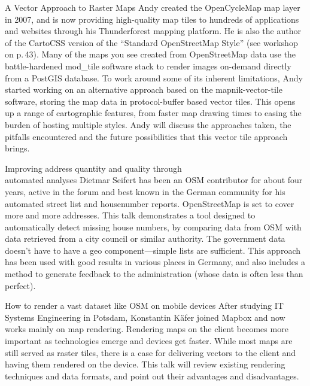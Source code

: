 %
{A Vector Approach to Raster Maps}%
{Andy created the OpenCycleMap map layer in 2007, and is now providing high-quality map tiles to hundreds of applications and websites through his Thunderforest mapping platform. He is also the author of the CartoCSS version of the ``Standard OpenStreetMap Style'' (see workshop on p.\,43).}%
{Many of the maps you see created from OpenStreetMap data use the battle-hardened mod\_tile software stack to render images on-demand directly from a PostGIS data\-base. To work around some of its inherent limitations, Andy started working on an alternative approach based on the mapnik-vector-tile software, storing the map data in protocol-buffer based vector tiles. This opens up a range of cartographic features, from faster map drawing times to easing the burden of hosting multiple styles. Andy will discuss the approaches taken, the pitfalls encountered and the future possibilities that this vector tile approach brings.}


%
{Improving address quantity and quality through\\ automated analyses}%
{Dietmar Seifert has been an OSM contributor for about four years, active in the forum and best known in the German  community for his automated street list and housenumber reports.}%
{OpenStreetMap is set to cover more and more addresses. This talk demonstrates a tool designed to automatically detect missing house numbers, by comparing data from OSM with data retrieved from a city council or similar authority. The government data doesn't have to have a geo component---simple lists are sufficient. This approach has been used with good results in various places in Germany, and also includes a method to generate feedback to the administration (whose data is often less than perfect).}

%
{How to render a vast dataset like OSM on mobile devices}%
{After studying IT Systems Engineering in Potsdam, Konstantin Käfer joined Mapbox and now works mainly on map rendering.}%
{Rendering maps on the client becomes more important as technologies emerge and devices get faster. While most maps are still served as raster tiles, there is a case for delivering vectors to the client and having them rendered on the device. This talk will review existing rendering techniques and data formats, and point out their advantages and disadvantages.}

